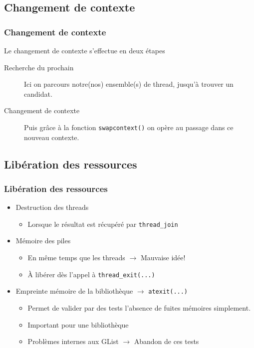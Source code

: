 \documentclass{beamer}
\begin{document}
\subsection{Changement de contexte}

\begin{frame}
  \frametitle{Changement de contexte}
  Le changement de contexte s'effectue en deux étapes
  
  \begin{description}
  \item[Recherche du prochain] Ici on parcours notre(nos) ensemble(s) de thread, jusqu'à trouver un candidat.
  \item[Changement de contexte] Puis grâce à la fonction \verb!swapcontext()! on opère au passage dans ce nouveau contexte.
	
\end{description}

\end{frame}

\subsection{Libération des ressources}

\begin{frame}[containsverbatim]
  \frametitle{Libération des ressources}
  \begin{itemize}
  \item Destruction des threads
    \begin{itemize}
      \item Lorsque le résultat est récupéré par \verb!thread_join!
    \end{itemize}
  \item Mémoire des piles
    \begin{itemize}
    \item En même temps que les threads $\rightarrow $ Mauvaise idée!
    \item À libérer dès l'appel à \verb!thread_exit(...)!
    \end{itemize}
  \item Empreinte mémoire de la bibliothèque
    $\rightarrow $ \verb!atexit(...)!
    \begin{itemize}
      \item Permet de valider par des tests l'absence de fuites mémoires
        simplement.
      \item Important pour une bibliothèque
      \item Problèmes internes aux GList $\rightarrow $ Abandon de ces tests
    \end{itemize}
  \end{itemize}
\end{frame}
\end{document}
